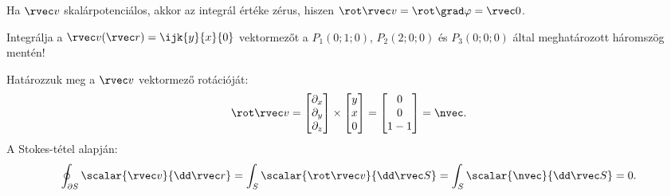 \documentclass[a4paper, 12pt]{scrartcl}
\newcommand\arcv{\rvec r}
\begin{document}
\begin{note}
  Ha $\rvec v$ skalárpotenciálos, akkor az integrál értéke zérus, hiszen
  $\rot \rvec v = \rot \grad \varphi = \rvec 0$.
\end{note}

\begin{example}
  Integrálja a $\rvec v(\rvec r) = \ijk{y}{x}{0}$ vektormezőt a $P_1(0;1;0)$,
  $P_2(2;0;0)$ és $P_3(0;0;0)$ által meghatározott háromszög mentén!

  Határozzuk meg a $\rvec v$ vektormező rotációját:
  $$
    \rot \rvec v
    =
    \begin{bmatrix}
      \partial_x \\ \partial_y \\ \partial_z
    \end{bmatrix}
    \times
    \begin{bmatrix}
      y \\ x \\ 0
    \end{bmatrix}
    =
    \begin{bmatrix}
      0 \\ 0 \\ 1 - 1
    \end{bmatrix}
    =
    \nvec
    \text.
  $$
  A Stokes-tétel alapján:
  $$
    \oint_{\partial S} \scalar{\rvec v}{\dd \arcv}
    = \int_S \scalar{\rot \rvec v}{\dd \rvec S}
    = \int_S \scalar{\nvec}{\dd \rvec S}
    = 0
    \text.
  $$
\end{example}
\end{document}
